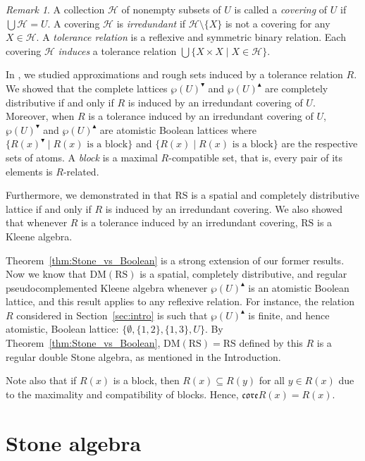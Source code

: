 \documentclass[11pt,a4paper]{amsart}
\newcommand{\UP}{\blacktriangle}
\newcommand{\DOWN}{\blacktriangledown}
\theoremstyle{plain}
\theoremstyle{definition}
\theoremstyle{remark}
\newtheorem{remark}[theorem]{Remark}
\numberwithin{equation}{section}
\begin{document}
\begin{remark} \label{rem:Australian} 
A collection $\mathcal{H}$ of nonempty subsets of $U$ is called a 
\emph{covering} of $U$ if $\bigcup \mathcal{H} = U$. 
A covering $\mathcal{H}$ is \emph{irredundant} if $\mathcal{H} \setminus \{X\}$ 
is not a  covering for any $X \in \mathcal{H}$. 
A \emph{tolerance relation} is a reflexive and symmetric binary relation.
Each covering $\mathcal{H}$ \emph{induces} a tolerance relation
$\bigcup \{X \times X \mid X \in \mathcal{H}\}$.

In \cite{JarRad14}, we studied approximations and rough sets 
induced by a tolerance relation $R$. We showed that the complete 
lattices $\wp(U)^\DOWN$ and $\wp(U)^\UP$ are completely 
distributive if and only if $R$ is induced by an irredundant covering of $U$. Moreover, 
when $R$ is a tolerance induced by an irredundant covering of $U$, $\wp(U)^\DOWN$ and $\wp(U)^\UP$ 
are atomistic Boolean lattices where 
 $\{R(x)^\DOWN \mid \text{$R(x)$ is a block} \}$ and 
$\{R(x) \mid \text{$R(x)$ is a block} \}$ are the respective 
sets of atoms. A \emph{block} is a maximal $R$-compatible set, 
that is, every pair of its elements is $R$-related.

Furthermore, we demonstrated in \cite{JarRad14} that 
$\mathrm{RS}$ is a spatial and completely distributive 
lattice if and only if 
$R$ is induced by an irredundant covering. We also 
showed that whenever $R$ is a tolerance induced by an irredundant covering,  
$\mathrm{RS}$ is a Kleene algebra.

Theorem~\ref{thm:Stone_vs_Boolean} 
is a strong extension of our former results. Now we know 
that $\mathrm{DM(RS)}$ is a spatial, completely distributive, and
regular pseudocomplemented Kleene algebra whenever
$\wp(U)^\UP$ is an atomistic Boolean lattice, and this
result applies to any reflexive relation. For instance,
the relation $R$ considered in Section~\ref{sec:intro} is such that
$\wp(U)^\UP$ is finite, and hence atomistic, Boolean
lattice: $\{ \emptyset, \{1,2\}, \{1,3\}, U\}$. By
Theorem~\ref{thm:Stone_vs_Boolean}, 
$\mathrm{DM(RS)} = \mathrm{RS}$ defined by this 
$R$ is a regular double Stone algebra, as
mentioned in the Introduction.

Note also that if $R(x)$ is a block, then 
$R(x) \subseteq R(y)$ for all $y \in R(x)$ 
due to the maximality and compatibility of blocks.
Hence, $\mathfrak{core}R(x) = R(x)$.
\end{remark}


\section{Stone algebra} \label{sec:Stone}
\end{document}
